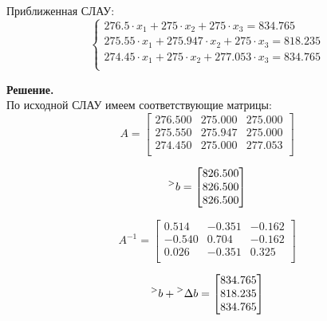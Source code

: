 \documentclass[14pt,a4paper]{scrartcl}
\begin{document}
Приближенная СЛАУ:
\begin{equation*}
	\begin{cases}
	276.5 \cdot x_1      +  275 \cdot x_2      +  275 \cdot x_3   =   834.765 \\ 
	275.55 \cdot x_1  +  275.947 \cdot x_2      +  275 \cdot x_3   =   818.235 \\ 
	274.45 \cdot x_1      +  275 \cdot x_2  +  277.053 \cdot x_3   =   834.765 \\ 
	\end{cases}
\end{equation*}

\textbf{Решение.}\\
 По исходной СЛАУ имеем соответствующие матрицы:
\begin{equation*}
	A = 
	\begin{bmatrix}{}
	276.500 & 275.000 & 275.000 \\ 
	275.550 & 275.947 & 275.000 \\ 
	274.450 & 275.000 & 277.053 \\ 
	\end{bmatrix}
\end{equation*}

\begin{equation*}
	\prescript{>}{}{b} = 
	\begin{bmatrix}{}
	826.500 \\ 
	826.500 \\ 
	826.500 \\ 
	\end{bmatrix}
\end{equation*}

\begin{equation*}
	A^{-1} = 
	\begin{bmatrix}{}
	0.514 & -0.351 & -0.162 \\ 
	-0.540 & 0.704 & -0.162 \\ 
	0.026 & -0.351 & 0.325 \\ 
	\end{bmatrix}
\end{equation*}


\begin{equation*}
	\prescript{>}{}{b} + \prescript{>}{}{\Delta b} = 
	\begin{bmatrix}{}
	834.765 \\ 
	818.235 \\ 
	834.765 \\ 
	\end{bmatrix}
\end{equation*}
\end{document}
